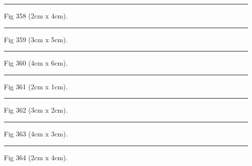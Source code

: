 \documentclass[a4paper,11pt]{article}
\begin{document}
\begin{swarmwrap}%
  \begin{minipage}[t]{2cm}
    \centering
    \rule{\linewidth}{4cm}
    {\footnotesize Fig 358 (2cm x 4cm).}
  \end{minipage}%
\end{swarmwrap}%
\swarmwrapnext
\lipsum[58]%

\begin{swarmwrap}%
  \begin{minipage}[t]{3cm}
    \centering
    \rule{\linewidth}{5cm}
    {\footnotesize Fig 359 (3cm x 5cm).}
  \end{minipage}%
\end{swarmwrap}%
\swarmwrapnext
\lipsum[59]%

\begin{swarmwrap}%
  \begin{minipage}[t]{4cm}
    \centering
    \rule{\linewidth}{6cm}
    {\footnotesize Fig 360 (4cm x 6cm).}
  \end{minipage}%
\end{swarmwrap}%
\swarmwrapnext
\lipsum[60]%

\begin{swarmwrap}%
  \begin{minipage}[t]{2cm}
    \centering
    \rule{\linewidth}{1cm}
    {\footnotesize Fig 361 (2cm x 1cm).}
  \end{minipage}%
\end{swarmwrap}%
\swarmwrapnext
\lipsum[61]%

\begin{swarmwrap}%
  \begin{minipage}[t]{3cm}
    \centering
    \rule{\linewidth}{2cm}
    {\footnotesize Fig 362 (3cm x 2cm).}
  \end{minipage}%
\end{swarmwrap}%
\swarmwrapnext
\lipsum[62]%

\begin{swarmwrap}%
  \begin{minipage}[t]{4cm}
    \centering
    \rule{\linewidth}{3cm}
    {\footnotesize Fig 363 (4cm x 3cm).}
  \end{minipage}%
\end{swarmwrap}%
\swarmwrapnext
\lipsum[63]%

\begin{swarmwrap}%
  \begin{minipage}[t]{2cm}
    \centering
    \rule{\linewidth}{4cm}
    {\footnotesize Fig 364 (2cm x 4cm).}
  \end{minipage}%
\end{swarmwrap}%
\swarmwrapnext
\lipsum[64]%
\end{document}
